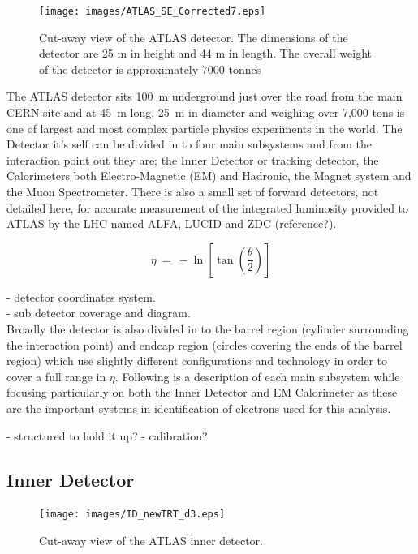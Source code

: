 	\begin{figure}[h]
		\begin{center}
			\texttt{[image: images/ATLAS\_SE\_Corrected7.eps]}
		\end{center}
		\caption{Cut-away view of the ATLAS detector. The dimensions of the detector are 25 m in height and 44 m in length. The overall weight of the detector is approximately 7000 tonnes}
		\label{fig:ATLAS_cutaway}
	\end{figure}



	The ATLAS detector sits \SI{100}{\m} underground just over the road from the main CERN site and at \SI{45}{\m} long, \SI{25}{\m} in diameter and weighing over 7,000 tons is one of largest and most complex particle physics experiments in the world. The Detector it's self can be divided in to four main subsystems and from the interaction point out they are; the Inner Detector or tracking detector, the Calorimeters both Electro-Magnetic (EM) and Hadronic, the Magnet system and the Muon Spectrometer. There is also a small set of forward detectors, not detailed here, for accurate measurement of the integrated luminosity provided to ATLAS by the LHC named ALFA, LUCID and ZDC (reference?). 

	\begin{equation}
		\eta~=~-\ln[\tan(\frac{\theta}{2})]
	\end{equation}

	- detector coordinates system.\\
	- sub detector coverage and diagram.\\

	Broadly the detector is also divided in to the barrel region (cylinder surrounding the interaction point) and endcap region (circles covering the ends of the barrel region) which use slightly different configurations and technology in order to cover a full range in $\eta$.
	Following is a description of each main subsystem while focusing particularly on both the Inner Detector and EM Calorimeter as these are the important systems in identification of electrons used for this analysis.


	- structured to hold it up?
	- calibration?



	\subsection{Inner Detector}

		\begin{figure}[h]
			\begin{center}
				\texttt{[image: images/ID\_newTRT\_d3.eps]}
			\end{center}
			\caption{Cut-away view of the ATLAS inner detector.}
			\label{fig:ATLAS_inner}
		\end{figure}

